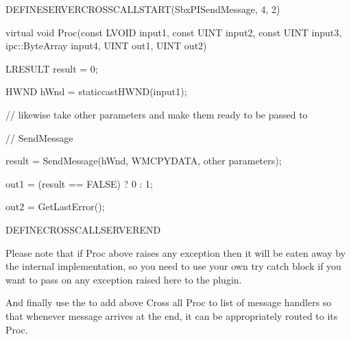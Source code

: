 \documentclass[letterpaper,12pt,english,openany,oneside]{sphinxmanual}
\begin{document}
\begin{sphinxVerbatim}[commandchars=\\\{\}]
 DEFINE\PYGZus{}SERVER\PYGZus{}CROSS\PYGZus{}CALL\PYGZus{}START(SbxPISendMessage, 4, 2)

      virtual void Proc(const LVOID\PYGZam{} input1, const UINT\PYGZam{} input2, const UINT\PYGZam{} input3, ipc::ByteArray \PYGZam{}input4, UINT\PYGZam{} out1, UINT\PYGZam{} out2)

     \PYGZob{}

        LRESULT result = 0;

        HWND hWnd = static\PYGZus{}cast\PYGZlt{}HWND\PYGZgt{}(input1);

        //  likewise take other parameters and make them ready to be passed to

        // SendMessage

        result = SendMessage(hWnd, WM\PYGZus{}CPYDATA, \PYGZlt{}other parameters\PYGZgt{});

        out1 = (result == FALSE) ? 0 : 1;

        out2 = GetLastError();

      \PYGZcb{}

DEFINE\PYGZus{}CROSS\PYGZus{}CALL\PYGZus{}SERVER\PYGZus{}END
\end{sphinxVerbatim}

Please note that if Proc above raises any exception then it will be eaten away by the internal implementation, so you need to use your own try catch block if you want to pass on any exception raised here to the plug\sphinxhyphen{}in.

And finally use the  to add above Cross all Proc to list of message handlers so that whenever  message arrives at the  end, it can be appropriately routed to its Proc.

\begin{sphinxVerbatim}[commandchars=\\\{\}]
       
       
\end{sphinxVerbatim}
\end{document}
